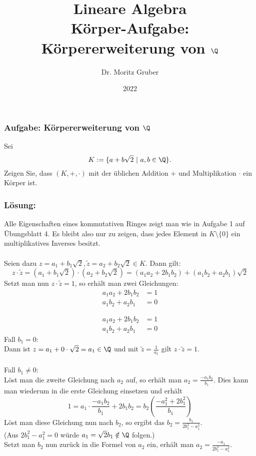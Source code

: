 

\title{Lineare Algebra\\[3mm] 
	\large Körper-Aufgabe: Körpererweiterung von $\Q$
}
\author{Dr. Moritz Gruber} 
\date{2022}



%
\begin{frame}[plain] 
 \titlepage
\end{frame}
%
\begin{frame}\frametitle{Aufgabe: Körpererweiterung von $\Q$}
Sei
$$
	K := \{ a + b\sqrt{2} ~|~a,b \in \Q \}. 
$$
Zeigen Sie, dass $(K,+,\cdot)$ mit der \"ublichen Addition $+$ und Multiplikation $\cdot$ ein  K\"orper ist.
\end{frame}
%
%
\begin{frame}\frametitle{Lösung: }
%
Alle Eigenschaften eines kommutativen Ringes zeigt man wie in Aufgabe 1 auf  \"Ubungsblatt 4. Es bleibt also nur zu zeigen, dass jedes Element in $K \setminus \{0\}$ ein multiplikatives Inverses besitzt. \\ \pause
\quad\\
Seien dazu $z=a_1 + b_1 \sqrt{2}, \tilde z=a_2+b_2\sqrt{2} \in K$. Dann gilt: \pause
$$
z \cdot \tilde z =(a_1 + b_1\sqrt{2}) \cdot (a_2 + b_2\sqrt{2}) = (a_1a_2 + 2b_1b_2) + (a_1b_2 + a_2b_1)\sqrt{2}
$$ \pause
Setzt man nun $z \cdot \tilde z=1$, so erh\"alt man zwei Gleichungen: \pause
\begin{align*}
a_1a_2 + 2b_1b_2&=1\\ 
a_1b_2 + a_2b_1&=0
\end{align*}
\end{frame}
%
\begin{frame}
\begin{align*}
a_1a_2 + 2b_1b_2&=1\\
a_1b_2 + a_2b_1&=0
\end{align*}
Fall $b_1=0$: \\Dann ist $z=a_1+0\cdot \sqrt{2}=a_1 \in \Q$ und mit $\tilde z=\frac{1}{a_1}$ gilt $z\cdot \tilde z=1$.\\\quad\\
Fall $b_1 \ne 0$: \\
L\"ost man die zweite Gleichung nach $a_2$ auf, so erh\"alt man $a_2=\frac{-a_1b_2}{b_1}$.  \pause Dies kann man wiederum in die erste Gleichung einsetzen und erh\"alt
$$
1=a_1\cdot \frac{-a_1b_2}{b_1} + 2b_1b_2=b_2 \left( \frac{-a_1^2+2b_1^2}{b_1}\right)
$$ \pause
L\"ost man diese Gleichung nun nach $b_2$, so ergibt das $b_2=\frac{b_1}{2b_1^2-a_1^2}$. \\
(Aus $2b_1^2-a_1^2=0$ würde $a_1=\sqrt{2}b_1 \notin \Q$ folgen.)
\\ \pause Setzt man $b_2$ nun zur\"uck in die Formel von $a_2$ ein, erh\"alt man $a_2=\frac{-a_1}{2b_1^2-a_1^2}$.\\ 
\end{frame}
